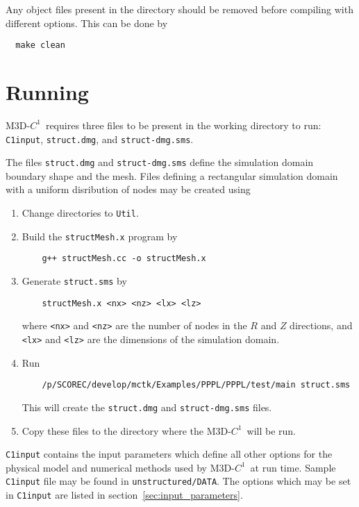 \documentclass[letterpaper]{book}
\newcommand{\codename}{\textsc{M3D-$C^1$}}
\begin{document}
 Any object files present in the directory should be removed before
 compiling with different options.  This can be done by
\begin{verbatim}
  make clean
\end{verbatim}


\section{Running}

\codename\ requires three files to be present in the working directory
to run: \texttt{C1input}, \texttt{struct.dmg}, and
\texttt{struct-dmg.sms}.

The files \texttt{struct.dmg} and \texttt{struct-dmg.sms} define the
simulation domain boundary shape and the mesh.  Files defining a
rectangular simulation domain with a uniform disribution of nodes may
be created using
\begin{enumerate}
\item Change directories to \texttt{Util}.
\item Build the \texttt{structMesh.x} program by 
  \begin{verbatim}
    g++ structMesh.cc -o structMesh.x
  \end{verbatim}
\item Generate \texttt{struct.sms} by
  \begin{verbatim}
    structMesh.x <nx> <nz> <lx> <lz>
  \end{verbatim}
  where \texttt{<nx>} and \texttt{<nz>} are the number of nodes in the
  $R$ and $Z$ directions, and \texttt{<lx>} and \texttt{<lz>} are the
  dimensions of the simulation domain.
\item Run 
  \begin{verbatim}
    /p/SCOREC/develop/mctk/Examples/PPPL/PPPL/test/main struct.sms
  \end{verbatim} 
  This will create the \texttt{struct.dmg} and \texttt{struct-dmg.sms}
  files.
\item Copy these files to the directory where the \codename\ will be
  run.
\end{enumerate}

\texttt{C1input} contains the input parameters which define all other
options for the physical model and numerical methods used by
\codename\ at run time.  Sample \texttt{C1input} file may be found in
\texttt{unstructured/DATA}.  The options which may be set in
\texttt{C1input} are listed in section~\ref{sec:input_parameters}.
\end{document}
